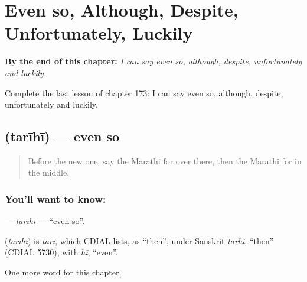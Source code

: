 
\chapter{Even so, Although, Despite, Unfortunately, Luckily}
\label{ch:mr-even-so-although-despite-unfortunately-luckily}

\begin{chapteropening}
\textbf{By the end of this chapter:} \emph{I can say even so, although, despite, unfortunately and luckily.}

Complete the last lesson of chapter 173: I can say even so, although, despite, unfortunately and luckily.
\end{chapteropening}

\section[\texorpdfstring{\mr{तरीही} (tarīhī)}{तरीही (tarīhī)}]{ (tarīhī) — even so}

\label{lesson:MR-C173-tarihi}



\begin{quote}
Before the new one: say the Marathi for over there, then the Marathi for in the middle.
\end{quote}

\subsection*{You'll want to know: }
\textbf{} — \emph{tarīhī} — \textquotedblleft{}even so\textquotedblright{}.

\begin{cousinweb}
\textbf{} (\emph{tarīhī}) is \emph{tarī}, which CDIAL lists, as \textquotedblleft{}then\textquotedblright{}, under Sanskrit \emph{tarhi}, \textquotedblleft{}then\textquotedblright{} (CDIAL 5730), with \emph{hī}, \textquotedblleft{}even\textquotedblright{}.
\end{cousinweb}

\begin{grammarlens}[title={What you've built}]
One more word for this chapter.
\end{grammarlens}

